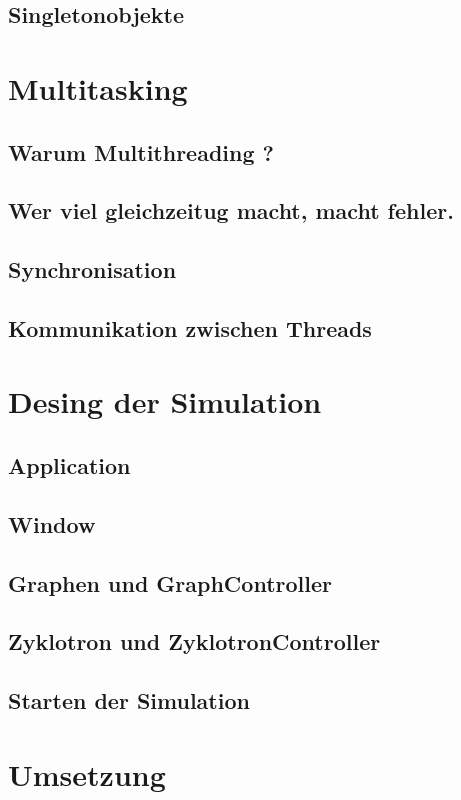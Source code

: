 \documentclass[14pt, a4paper]{report}
\begin{document}
\section{Singletonobjekte}

\chapter{Multitasking}
\section{Warum Multithreading ?}
\section{Wer viel gleichzeitug macht, macht fehler.}
\section{Synchronisation}
\section{Kommunikation zwischen Threads}

\chapter{Desing der Simulation}
\section{Application}
\section{Window} 
\section{Graphen und GraphController}
\section{Zyklotron und ZyklotronController}
\section{Starten der Simulation}

\chapter{Umsetzung}
\end{document}
